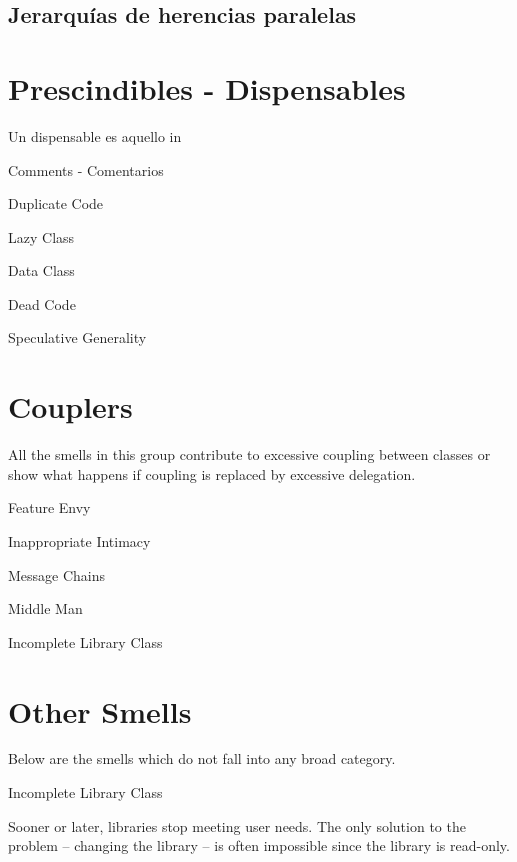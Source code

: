 \documentclass[11pt,a4paper,oneside]{book}
\begin{document}
\subsection{Jerarquías de herencias paralelas}



\section{Prescindibles - Dispensables}


Un dispensable es aquello in


    Comments - Comentarios
    
    Duplicate Code
    
    Lazy Class

    Data Class

Dead Code

    Speculative Generality



\section{Couplers}

All the smells in this group contribute to excessive coupling between classes or show what happens if coupling is replaced by excessive delegation.

    Feature Envy
    
    Inappropriate Intimacy
    
    Message Chains
    
    Middle Man

    Incomplete Library Class


\section{Other Smells}

Below are the smells which do not fall into any broad category.

Incomplete Library Class

Sooner or later, libraries stop meeting user needs. The only solution to the problem – changing the library – is often impossible since the library is read-only.
\end{document}
